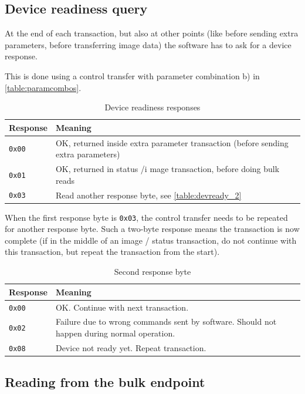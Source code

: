 \documentclass{article}
\begin{document}
\subsection{Device readiness query}
\label{ssec:devready}

At the end of each transaction, but also at other points (like before
sending extra parameters, before transferring image data) the software has to ask for a device response.

This is done using a control transfer with parameter combination b) in \autoref{table:paramcombos}.

\begin{table}[H]
  \caption{Device readiness responses}
  \centering
  \begin{tabular}{p{1.5cm} | p{9cm}}
    Response & Meaning \\ \hline
    {\tt 0x00} & OK, returned inside extra parameter transaction (before sending extra parameters) \\
    {\tt 0x01} & OK, returned in status /i mage transaction, before doing bulk reads \\
    {\tt 0x03} & Read another response byte, see \autoref{table:devready_2} \\
  \end{tabular}
\end{table}

When the first response byte is {\tt 0x03}, the control transfer needs to be repeated for another
response byte. Such a two-byte response means the transaction is now complete (if in the middle
of an image / status transaction, do not continue with this transaction, but repeat the transaction from the start).

\begin{table}[H]
  \caption{Second response byte}
  \centering
  \begin{tabular}{l | p{9cm}}
    Response & Meaning \\ \hline
    {\tt 0x00} & OK. Continue with next transaction. \\
    {\tt 0x02} & Failure due to wrong commands sent by software. Should not happen during normal operation. \\
    {\tt 0x08} & Device not ready yet. Repeat transaction. \\
  \end{tabular}
  \label{table:devready_2}
\end{table}

\subsection{Reading from the bulk endpoint}
\label{ssec:bulkread}
\end{document}
